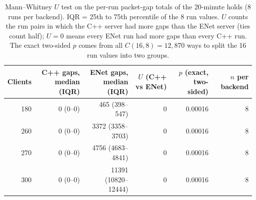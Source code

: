 \documentclass[11pt]{article}
\begin{document}
\begin{table}[H]
\centering
\footnotesize
\setlength{\tabcolsep}{3pt}
\begin{tabular}{@{}rrrrrr@{}}
\toprule
Clients & C++ gaps, median (IQR) & ENet gaps, median (IQR) & $U$ (C++ vs ENet) & $p$ (exact, two-sided) & $n$ per backend \\
\midrule
180 & 0 (0--0) & 465 (398--547) & 0 & 0.00016 & 8 \\
260 & 0 (0--0) & 3372 (3358--3703) & 0 & 0.00016 & 8 \\
270 & 0 (0--0) & 4756 (4683--4841) & 0 & 0.00016 & 8 \\
300 & 0 (0--0) & 11391 (10820--12444) & 0 & 0.00016 & 8 \\
\bottomrule
\end{tabular}
\caption{Mann--Whitney $U$ test on the per-run packet-gap totals of the 20-minute holds (8 runs per backend). IQR = 25th to 75th percentile of the 8 run values. $U$ counts the run pairs in which the C++ server had more gaps than the ENet server (ties count half); $U=0$ means every ENet run had more gaps than every C++ run. The exact two-sided $p$ comes from all $C(16,8)=12{,}870$ ways to split the 16 run values into two groups.}
\label{tab:mwu}
\end{table}
\end{document}
